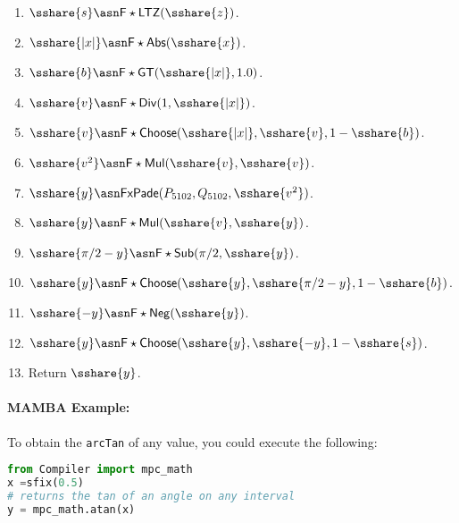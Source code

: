 \begin{enumerate}
  \item $\sshare{s} \asn \mathsf{F\star LTZ}(\sshare{z})$.
  \item $\sshare{|x|} \asn \mathsf{F\star Abs}(\sshare{x})$.
  \item $\sshare{b} \asn \mathsf{F\star GT}(\sshare{|x|},1.0)$.
  \item $\sshare{v} \asn \mathsf{F\star Div}(1,\sshare{|x|})$.
  \item $\sshare{v} \asn \mathsf{F\star Choose}(\sshare{|x|},\sshare{v},1-\sshare{b})$.
  \item $\sshare{v^2} \asn \mathsf{F\star Mul}(\sshare{v},\sshare{v})$.
  \item $\sshare{y} \asn \mathsf{FxPade}(P_{5102},Q_{5102},\sshare{v^2})$.
  \item $\sshare{y} \asn \mathsf{F\star Mul}(\sshare{v},\sshare{y})$.
  \item $\sshare{\pi/2-y} \asn \mathsf{F\star Sub}(\pi/2,\sshare{y})$.
  \item $\sshare{y} \asn \mathsf{F\star Choose}(\sshare{y},\sshare{\pi/2-y},1-\sshare{b})$.
  \item $\sshare{-y} \asn \mathsf{F\star Neg}(\sshare{y})$.
  \item $\sshare{y} \asn \mathsf{F\star Choose}(\sshare{y},\sshare{-y},1-\sshare{s})$.
  \item Return $\sshare{y}$.
\end{enumerate}

\paragraph{MAMBA Example:} To obtain the \verb|arcTan| of any value, you could execute the following:
\begin{lstlisting}[language={python}]
from Compiler import mpc_math
x =sfix(0.5)
# returns the tan of an angle on any interval
y = mpc_math.atan(x)
\end{lstlisting}
